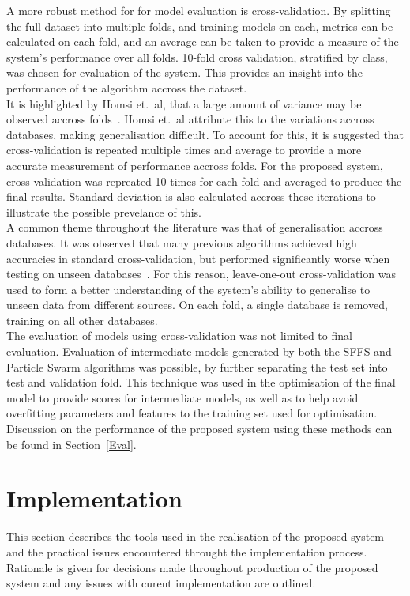 \documentclass[titlepage, 12pt]{scrartcl} \usepackage{enumitem}
\begin{document}
A more robust method for for model evaluation is cross-validation. By splitting
the full dataset into multiple folds, and training models on each, metrics can
be calculated on each fold, and an average can be taken to provide a measure of
the system's performance over all folds. 10-fold cross validation, stratified
by class, was chosen for evaluation of the system. This provides an insight
into the performance of the algorithm accross the dataset.\\
It is highlighted by Homsi et.\ al, that a large amount of variance may be observed
accross folds~\parencite[p.1637]{Homsi2017}. Homsi et.\ al attribute this to the
variations accross databases, making generalisation difficult. To account for
this, it is suggested that cross-validation is repeated multiple times and
average to provide a more accurate measurement of performance accross folds.
For the proposed system, cross validation was repreated 10 times for each fold
and averaged to produce the final results. Standard-deviation is also
calculated accross these iterations to illustrate the possible prevelance of
this.\\

A common theme throughout the literature was that of generalisation accross
databases. It was observed that many previous algorithms achieved high
accuracies in standard cross-validation, but performed significantly worse when
testing on unseen databases~\parencite{Homsi2017, Bobillo2016}. For this
reason, leave-one-out cross-validation was used to form a better understanding
of the system's ability to generalise to unseen data from different sources. On
each fold, a single database is removed, training on all other databases.\\

The evaluation of models using cross-validation was not limited to final
evaluation. Evaluation of intermediate models generated by both the SFFS and Particle Swarm
algorithms was possible, by further separating the test set into test and
validation fold. This technique was used in the optimisation of the
final model to provide scores for intermediate models, as well as to help avoid
overfitting parameters and features to the training set used for
optimisation.\\

Discussion on the performance of the proposed system using these methods can be
found in Section~\ref{Eval}.

\section{Implementation}
This section describes the tools used in the realisation of the
proposed system and the practical issues encountered throught the
implementation process. Rationale is given for decisions made throughout
production of the proposed system and any issues with curent implementation are
outlined.
\end{document}
